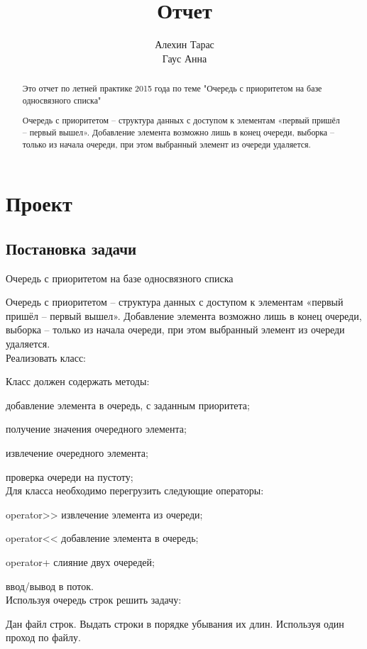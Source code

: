 \documentclass[12pt]{report}
\begin{document}
	
\title{Отчет}
\author{Алехин Тарас\\ 
	Гаус Анна}

\vfill\tableofcontents\clearpage

\begin{abstract}
Это отчет по летней практике 2015 года по теме 
"Очередь с приоритетом на базе односвязного списка"

Очередь с приоритетом  –  структура данных с доступом к элементам «первый пришёл – первый вышел». Добавление элемента возможно лишь в конец очереди, выборка – только из начала очереди, при этом выбранный элемент из очереди удаляется.
\end{abstract}
\chapter{Проект}
\section{Постановка задачи}

Очередь с приоритетом на базе односвязного списка

Очередь с приоритетом \autocite{wikiList}  –  структура данных с доступом к элементам «первый пришёл – первый вышел». Добавление элемента возможно лишь в конец очереди, выборка – только из начала очереди, при этом выбранный элемент из очереди удаляется.\\


Реализовать класс:

Класс должен содержать методы:

добавление элемента в очередь, с заданным приоритета;

получение значения очередного элемента;

извлечение очередного элемента;

проверка очереди на пустоту;\\


Для класса необходимо перегрузить следующие операторы:

operator>> извлечение элемента из очереди;

operator<< добавление элемента в очередь;

operator+ слияние двух очередей;

ввод/вывод в поток.\\

Используя очередь строк решить задачу:


Дан файл строк. Выдать строки в порядке убывания их длин. Используя один проход по файлу.
\end{document}
